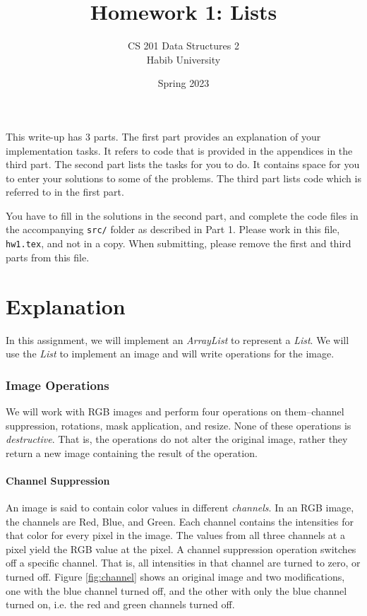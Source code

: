 \documentclass[addpoints]{exam}
\title{Homework 1: Lists}
\author{CS 201 Data Structures 2\\Habib University}
\date{Spring 2023}
\begin{document}
\maketitle

This write-up has 3 parts. The first part provides an explanation of your implementation tasks. It refers to code that is provided in the appendices in the third part. The second part lists the tasks for you to do. It contains space for you to enter your solutions to some of the problems. The third part lists code which is referred to in the first part.

You have to fill in the solutions in the second part, and complete the code files in the accompanying \texttt{src/} folder as described in Part 1. Please work in this file, \texttt{hw1.tex}, and not in a copy. When submitting, please remove the first and third parts from this file.

\part{Explanation}

In this assignment, we will implement an \textit{ArrayList} to represent a \textit{List}. We will use the \textit{List} to implement an image and will write operations for the image.

\section{Image Operations}
\label{sec:imgops}

We will work with RGB images and perform four operations on them--channel suppression, rotations, mask application, and resize. None of these operations is \textit{destructive}. That is, the operations do not alter the original image, rather they return a new image containing the result of the operation.

\subsection{Channel Suppression}

An image is said to contain color values in different \textit{channels}. In an RGB image, the channels are Red, Blue, and Green. Each channel contains the intensities for that color for every pixel in the image. The values from all three channels at a pixel yield the RGB value at the pixel. A channel suppression operation switches off a specific channel. That is, all intensities in that channel are turned to zero, or turned off. Figure \ref{fig:channel} shows an original image and two modifications, one with the blue channel turned off, and the other with only the blue channel turned on, i.e. the red and green channels turned off.
\end{document}
